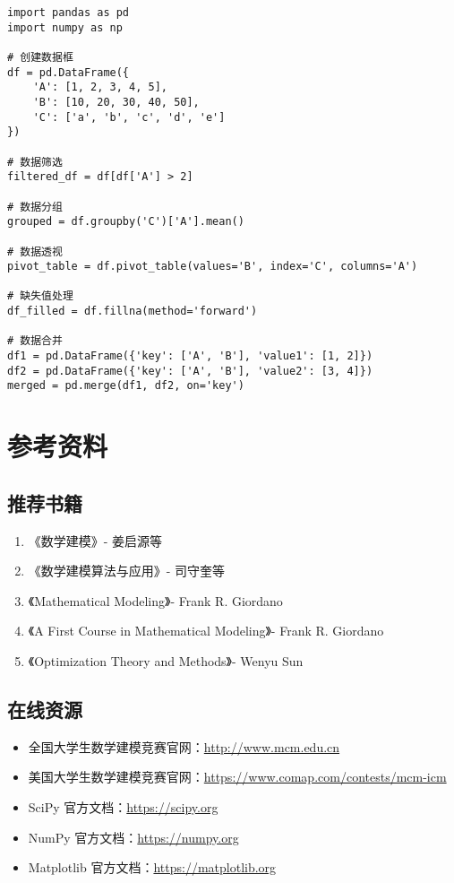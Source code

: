 \begin{codebox}[title=Pandas 常用操作]
\begin{verbatim}
import pandas as pd
import numpy as np

# 创建数据框
df = pd.DataFrame({
    'A': [1, 2, 3, 4, 5],
    'B': [10, 20, 30, 40, 50],
    'C': ['a', 'b', 'c', 'd', 'e']
})

# 数据筛选
filtered_df = df[df['A'] > 2]

# 数据分组
grouped = df.groupby('C')['A'].mean()

# 数据透视
pivot_table = df.pivot_table(values='B', index='C', columns='A')

# 缺失值处理
df_filled = df.fillna(method='forward')

# 数据合并
df1 = pd.DataFrame({'key': ['A', 'B'], 'value1': [1, 2]})
df2 = pd.DataFrame({'key': ['A', 'B'], 'value2': [3, 4]})
merged = pd.merge(df1, df2, on='key')
 \end{verbatim}
\end{codebox}

\section{参考资料}\label{app:references}

\subsection{推荐书籍}

\begin{enumerate}
    \item 《数学建模》- 姜启源等
    \item 《数学建模算法与应用》- 司守奎等
    \item 《Mathematical Modeling》- Frank R. Giordano
    \item 《A First Course in Mathematical Modeling》- Frank R. Giordano
    \item 《Optimization Theory and Methods》- Wenyu Sun
\end{enumerate}

\subsection{在线资源}

\begin{itemize}
    \item 全国大学生数学建模竞赛官网：\url{http://www.mcm.edu.cn}
    \item 美国大学生数学建模竞赛官网：\url{https://www.comap.com/contests/mcm-icm}
    \item SciPy 官方文档：\url{https://scipy.org}
    \item NumPy 官方文档：\url{https://numpy.org}
    \item Matplotlib 官方文档：\url{https://matplotlib.org}
\end{itemize}

